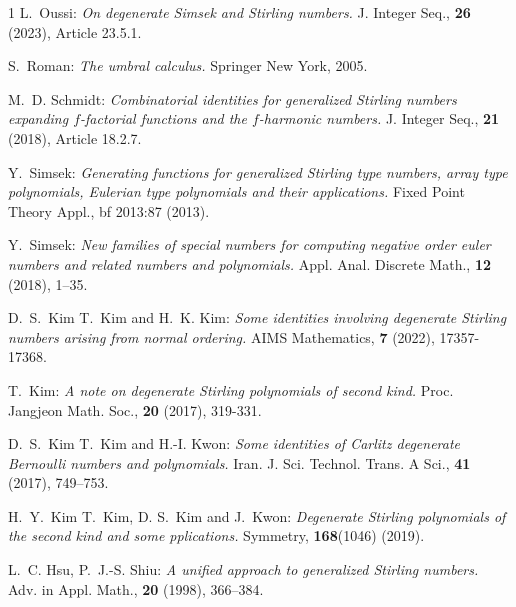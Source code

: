 \documentclass{amsart}
\numberwithin{equation}{section}
\theoremstyle{definition}
\theoremstyle{remark}
\begin{document}
\begin{thebibliography}{1}
{\small {\sc L.~Oussi:} {\it On degenerate Simsek and Stirling numbers.}
J. Integer Seq., {\bf 26} (2023), Article 23.5.1.}

{\small {\sc S.~Roman:} {\it The umbral calculus.}
Springer New York, 2005.}

{\small {\sc M.~D. Schmidt:} {\it Combinatorial identities for generalized Stirling numbers expanding $f$-factorial functions and the $f$-harmonic numbers.}
J. Integer Seq., {\bf 21} (2018), Article 18.2.7.}

{\small {\sc Y.~Simsek:} {\it Generating functions for generalized Stirling type numbers, array  type polynomials, Eulerian type polynomials and their applications.}
Fixed Point Theory Appl., {bf 2013}:87 (2013).}

{\small {\sc Y.~Simsek:} {\it New families of special numbers for computing negative order euler numbers and related numbers and polynomials.}
 Appl. Anal. Discrete Math., {\bf 12} (2018), 1--35.}
 
{\small {\sc D.~S.~Kim T.~Kim and H.~K. Kim:} {\it Some identities involving degenerate Stirling numbers arising from normal ordering.}
AIMS Mathematics, {\bf 7} (2022), 17357-17368.}

{\small {\sc T.~Kim:} {\it A note on degenerate Stirling polynomials of second kind.}
Proc. Jangjeon Math. Soc., {\bf 20} (2017), 319-331.}


{\small {\sc D.~S.~Kim T.~Kim and H.-I. Kwon:} {\it Some identities of Carlitz degenerate Bernoulli numbers and polynomials.}
Iran. J. Sci. Technol. Trans. A Sci., {\bf 41} (2017), 749–753.}

{\small {\sc H.~Y.~Kim T.~Kim, D. S.~Kim and J.~Kwon:} {\it Degenerate Stirling polynomials of the second kind and some pplications.}
Symmetry, {\bf 168}(1046) (2019).}


{\small {\sc L.~C. Hsu, P.~J.-S. Shiu:} {\it A unified approach to generalized Stirling numbers.}
Adv. in Appl. Math., {\bf 20} (1998), 366–384.}
\end{thebibliography}
\end{document}
